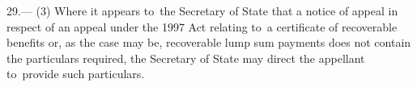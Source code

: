 \documentclass[12pt,a4paper]{article}
\begin{document}
29.—%
%
%
%
%
(3) Where it appears to~the Secretary of State that a notice of appeal in respect of an appeal under the 1997 Act relating to~a certificate of recoverable benefits or, as the case may be, recoverable lump sum payments does not contain the particulars required, the Secretary of State may direct the appellant to~provide such particulars.

\enlargethispage{-2\baselineskip}
\end{document}
